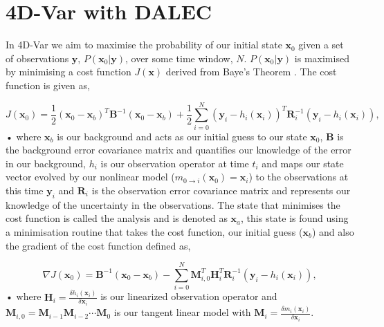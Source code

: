 \documentclass[11pt]{article}
\begin{document}
\section{4D-Var with DALEC}

In 4D-Var we aim to maximise the probability of our initial state $\textbf{x}_0$ given a set of observations $\textbf{y}$, $P(\textbf{x}_0|\textbf{y})$, over some time window, $N$.  $P(\textbf{x}_0|\textbf{y})$ is maximised by minimising a cost function $J(\textbf{x})$ derived from Baye's Theorem \cite{lewis2006dynamic}. The cost function is given as,

\begin{equation}
J(\textbf{x}_0) = \frac{1}{2}(\textbf{x}_0-\textbf{x}_b)^{T}\textbf{B}^{-1}(\textbf{x}_0-\textbf{x}_b)+\frac{1}{2}\sum_{i=0}^{N}(\textbf{y}_i-h_i(\textbf{x}_i))^{T}\textbf{R}_{i}^{-1}(\textbf{y}_i-h_i(\textbf{x}_i)),
\end{equation}•
where $\textbf{x}_b$ is our background and acts as our initial guess to our state $\textbf{x}_0$, $\textbf{B}$ is the background error covariance matrix and quantifies our knowledge of the error in our background, $h_i$ is our observation operator at time $t_i$ and maps our state vector evolved by our nonlinear model ($m_{0\rightarrow i}(\mathbf{x}_{0})=\textbf{x}_i$) to the observations at this time $\textbf{y}_i$ and $\textbf{R}_i$ is the observation error covariance matrix and represents our knowledge of the uncertainty in the observations. The state that minimises the cost function is called the analysis and is denoted as $\textbf{x}_a$, this state is found using a minimisation routine that takes the cost function, our initial guess ($\textbf{x}_b$) and also the gradient of the cost function defined as,

\begin{equation}
\nabla J(\textbf{x}_0) = \textbf{B}^{-1}(\textbf{x}_0-\textbf{x}_b)-\sum_{i=0}^{N}\textbf{M}_{i,0}^{T}\textbf{H}_i^{T}\textbf{R}_{i}^{-1}(\textbf{y}_i-h_i(\textbf{x}_i)),
\end{equation}•
where $\textbf{H}_i = \frac{\delta h_i(\textbf{x}_i)}{\delta\textbf{x}_i}$ is our linearized observation operator and $\mathbf{M}_{i,0}=\mathbf{M}_{i-1}\mathbf{M}_{i-2}\cdots\mathbf{M}_0$ is our tangent linear model with $\mathbf{M}_i=\frac{\delta m_{i}(\textbf{x}_{i})}{\delta \textbf{x}_{i}}$.
\end{document}
